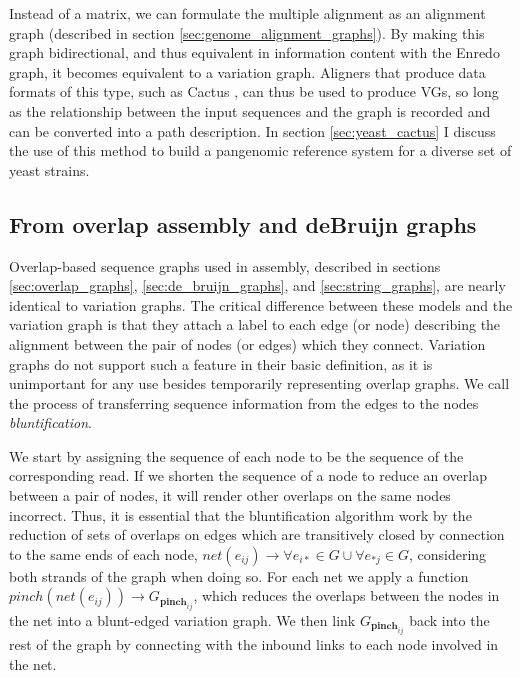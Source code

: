 Instead of a matrix, we can formulate the multiple alignment as an alignment graph (described in section \ref{sec:genome_alignment_graphs}).
By making this graph bidirectional, and thus equivalent in information content with the Enredo graph, it becomes equivalent to a variation graph.
Aligners that produce data formats of this type, such as Cactus \cite{Paten:2011fva}, can thus be used to produce VGs, so long as the relationship between the input sequences and the graph is recorded and can be converted into a path description.
In section \ref{sec:yeast_cactus} I discuss the use of this method to build a pangenomic reference system for a diverse set of yeast strains.

\subsection{From overlap assembly and deBruijn graphs}

Overlap-based sequence graphs used in assembly, described in sections \ref{sec:overlap_graphs}, \ref{sec:de_bruijn_graphs}, and \ref{sec:string_graphs}, are nearly identical to variation graphs.
The critical difference between these models and the variation graph is that they attach a label to each edge (or node) describing the alignment between the pair of nodes (or edges) which they connect.
Variation graphs do not support such a feature in their basic definition, as it is unimportant for any use besides temporarily representing overlap graphs.
We call the process of transferring sequence information from the edges to the nodes \emph{bluntification}.

We start by assigning the sequence of each node to be the sequence of the corresponding read.
If we shorten the sequence of a node to reduce an overlap between a pair of nodes, it will render other overlaps on the same nodes incorrect.
Thus, it is essential that the bluntification algorithm work by the reduction of sets of overlaps on edges which are transitively closed by connection to the same ends of each node, $net(e_{ij}) \to { \forall e_{i*} \in G } \cup { \forall e_{*j} \in G }$, considering both strands of the graph when doing so.
For each net we apply a function $pinch(net(e_{ij})) \to G_{\textbf{pinch}_{ij}}$, which reduces the overlaps between the nodes in the net into a blunt-edged variation graph.
We then link $G_{\textbf{pinch}_{ij}}$ back into the rest of the graph by connecting with the inbound links to each node involved in the net.

